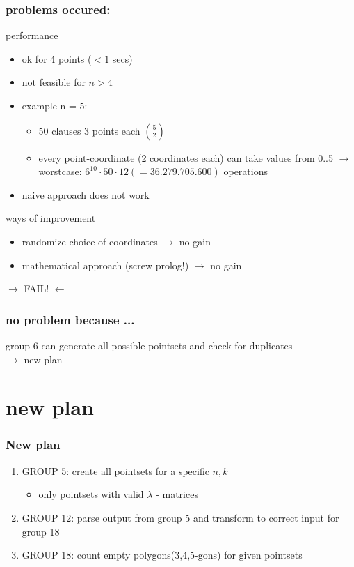 \documentclass{beamer}
\begin{document}
\begin{frame}
\frametitle{problems occured:}
performance
\begin{itemize}
\item ok for 4 points ($<1$ secs)
\item not feasible for $n > 4$
\item example n = 5:
\begin{itemize}
  \item 50 clauses 3 points each $\binom{5}{2}$
  \item every point-coordinate (2 coordinates each) can take values from 0..5 \newline $\rightarrow$ worstcase: $6^{10} \cdot 50 \cdot 12 (=36.279.705.600)$ operations
\end{itemize}
\item naive approach does not work
\end{itemize}
ways of improvement
\begin{itemize}
\item randomize choice of coordinates $\rightarrow$ no gain
\item mathematical approach (screw prolog!) $\rightarrow$ no gain
\end{itemize}
\pause
\begin{center}
\huge{ $\rightarrow$ FAIL! $\leftarrow$}
\end{center}
\end{frame}

\begin{frame}
\frametitle{no problem because ...}
group 6 can generate all possible pointsets and check for duplicates\\
$\rightarrow$ new plan
\end{frame}

\section{new plan}
\begin{frame}
\frametitle{New plan}
\begin{enumerate}
\item GROUP 5: create all pointsets for a specific $n,k$
  \begin{itemize}
  \item only pointsets with valid $\lambda$ - matrices
  \end{itemize}
\item GROUP 12: parse output from group 5 and transform to correct input for group 18
\item GROUP 18: count empty polygons(3,4,5-gons) for given pointsets



\end{enumerate}
\end{frame}
\end{document}
